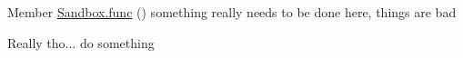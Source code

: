 
\begin{DoxyRefList}
\item[Member \mbox{\hyperlink{namespace_sandbox_a5de1ce02da82692d89595888f7ed0dad}{Sandbox.func}} ()]\label{todo__todo000001}%
%
something really needs to be done here, things are bad

\label{todo__todo000002}%
%
Really tho... do something
\end{DoxyRefList}